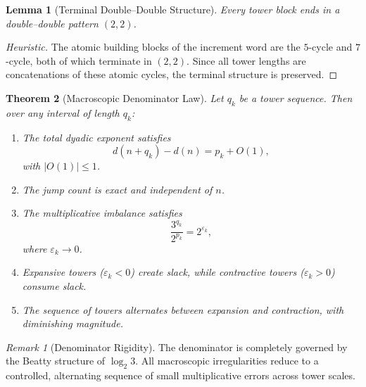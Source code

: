 \documentclass[12pt, oneside]{article}
\numberwithin{equation}{section}
\theoremstyle{definition}
\theoremstyle{plain}
\newtheorem{theorem}{Theorem}[section]
\newtheorem{lemma}[theorem]{Lemma}
\theoremstyle{remark}
\newtheorem*{remark}{Remark}
\begin{document}

\begin{lemma}[Terminal Double--Double Structure]
\label{lem:dd-terminal}
Every tower block ends in a double--double pattern $(2,2)$.
\end{lemma}

\begin{proof}[Heuristic]
The atomic building blocks of the increment word are the $5$-cycle and
$7$-cycle, both of which terminate in $(2,2)$.  Since all tower lengths
are concatenations of these atomic cycles, the terminal structure is
preserved.
\end{proof}


\begin{theorem}[Macroscopic Denominator Law]
\label{thm:denominator-law}
Let $q_k$ be a tower sequence.  Then over any interval of length $q_k$:
\begin{enumerate}
\item The total dyadic exponent satisfies
\[
d(n+q_k)-d(n) = p_k + O(1),
\]
with $|O(1)| \le 1$.

\item The jump count is exact and independent of $n$.

\item The multiplicative imbalance satisfies
\[
\frac{3^{q_k}}{2^{p_k}} = 2^{\varepsilon_k},
\]
where $\varepsilon_k \to 0$.

\item Expansive towers ($\varepsilon_k<0$) create slack, while
contractive towers ($\varepsilon_k>0$) consume slack.

\item The sequence of towers alternates between expansion and contraction,
with diminishing magnitude.
\end{enumerate}
\end{theorem}


\begin{remark}[Denominator Rigidity]
The denominator is completely governed by the Beatty structure of
$\log_2 3$.  All macroscopic irregularities reduce to a controlled,
alternating sequence of small multiplicative errors across tower scales.
\end{remark}


\end{document}
